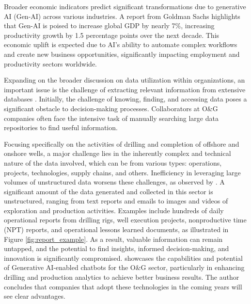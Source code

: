     Broader economic indicators predict significant transformations due to generative AI (Gen-AI) across various industries.
    A report from Goldman Sachs \citep{Hatzius2023} highlights that Gen-AI is poised to increase global GDP by nearly 7\%, increasing productivity growth by 1.5 percentage points over the next decade. 
    This economic uplift is expected due to AI's ability to automate complex workflows and create new business opportunities, significantly impacting employment and productivity sectors worldwide.


            
    Expanding on the broader discussion on data utilization within organizations, an important issue is the challenge of extracting relevant information from extensive databases \citep{Singh2023}. 
    Initially, the challenge of knowing, finding, and accessing data poses a significant obstacle to decision-making processes. 
    Collaborators at O\&G companies often face the intensive task of manually searching large data repositories to find useful information.


    
    Focusing specifically on the activities of drilling and completion of offshore and onshore wells, a major challenge lies in the inherently complex and technical nature of the data involved, which can be from various types: operations, projects, technologies, supply chains, and others. 
    Inefficiency in leveraging large volumes of unstructured data worsens these challenges, as observed by \citet{Singh2023}. 
    A significant amount of the data generated and collected in this sector is unstructured, ranging from text reports and emails to images and videos of exploration and production activities. 
    Examples include hundreds of daily operational reports from drilling rigs, well execution projects, nonproductive time (NPT) reports, and operational lessons learned documents, as illustrated in Figure \ref{fig:report_example}. 
    As a result, valuable information can remain untapped, and the potential to find insights, informed decision-making, and innovation is significantly compromised.
    \citet{Singh2023} showcases the capabilities and potential of Generative AI-enabled chatbots for the O\&G sector, particularly in enhancing drilling and production analytics to achieve better business results. The author concludes that companies that adopt these technologies in the coming years will see clear advantages.     
    
